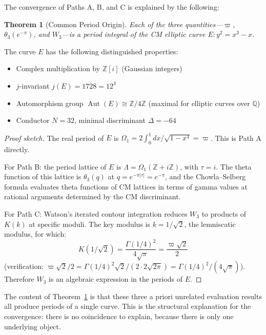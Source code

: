 \documentclass[12pt]{article}
\newtheorem{theorem}{Theorem}[section]
\theoremstyle{definition}
\theoremstyle{remark}
\begin{document}
The convergence of Paths A, B, and C is explained by the following:

\begin{theorem}[Common Period Origin]
\label{thm:cm}
Each of the three quantities---$\varpi$, $\theta_3(e^{-\pi})$, and $W_3$---is a period integral of the CM elliptic curve $E\!: y^2 = x^3 - x$.
\end{theorem}

The curve $E$ has the following distinguished properties:
\begin{itemize}[nosep]
    \item Complex multiplication by $\mathbb{Z}[i]$ (Gaussian integers)
    \item $j$-invariant $j(E) = 1728 = 12^3$
    \item Automorphism group $\operatorname{Aut}(E) \cong \mathbb{Z}/4\mathbb{Z}$ (maximal for elliptic curves over $\mathbb{Q}$)
    \item Conductor $N = 32$, minimal discriminant $\Delta = -64$
\end{itemize}

\begin{proof}[Proof sketch]
The real period of $E$ is $\Omega_1 = 2\!\int_0^1 dx/\sqrt{1-x^4} = \varpi$. This is Path A directly.

For Path B: the period lattice of $E$ is $\Lambda = \Omega_1(\mathbb{Z} + i\mathbb{Z})$, with $\tau = i$. The theta function of this lattice is $\theta_3(q)$ at $q = e^{-\pi|\tau|} = e^{-\pi}$, and the Chowla--Selberg formula evaluates theta functions of CM lattices in terms of gamma values at rational arguments determined by the CM discriminant.

For Path C: Watson's iterated contour integration reduces $W_3$ to products of $K(k)$ at specific moduli. The key modulus is $k = 1/\sqrt{2}$, the lemniscatic modulus, for which:
\[
    K(1/\sqrt{2}) = \frac{\Gamma(1/4)^2}{4\sqrt{\pi}} = \frac{\varpi\sqrt{2}}{2}
\]
(verification: $\varpi\sqrt{2}/2 = \Gamma(1/4)^2\sqrt{2}/(2\cdot 2\sqrt{2\pi}) = \Gamma(1/4)^2/(4\sqrt{\pi})$\;\checkmark). Therefore $W_3$ is an algebraic expression in the periods of $E$.
\end{proof}

The content of Theorem~\ref{thm:cm} is that these three a priori unrelated evaluation results all produce periods of a single curve. This is the structural explanation for the convergence: there is no coincidence to explain, because there is only one underlying object.

\end{document}
